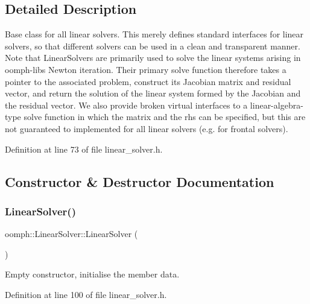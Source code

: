 \subsection{Detailed Description}
Base class for all linear solvers. This merely defines standard interfaces for linear solvers, so that different solvers can be used in a clean and transparent manner. Note that Linear\+Solvers are primarily used to solve the linear systems arising in oomph-\/lib\textquotesingle{}s Newton iteration. Their primary solve function therefore takes a pointer to the associated problem, construct its Jacobian matrix and residual vector, and return the solution of the linear system formed by the Jacobian and the residual vector. We also provide broken virtual interfaces to a linear-\/algebra-\/type solve function in which the matrix and the rhs can be specified, but this are not guaranteed to implemented for all linear solvers (e.\+g. for frontal solvers). 

Definition at line 73 of file linear\+\_\+solver.\+h.



\subsection{Constructor \& Destructor Documentation}
\mbox{\label{classoomph_1_1LinearSolver_a6e7e8728f36c888f052e49df8624b8ca}} 
\subsubsection{\texorpdfstring{Linear\+Solver()}{LinearSolver()}\hspace{0.1cm}{\footnotesize\ttfamily [1/2]}}
{\footnotesize\ttfamily oomph\+::\+Linear\+Solver\+::\+Linear\+Solver (\begin{DoxyParamCaption}{ }\end{DoxyParamCaption})\hspace{0.3cm}{\ttfamily [inline]}}



Empty constructor, initialise the member data. 



Definition at line 100 of file linear\+\_\+solver.\+h.

\mbox{\label{classoomph_1_1LinearSolver_a53c67c7ccd63b318f3af48e826ad57dc}} 

